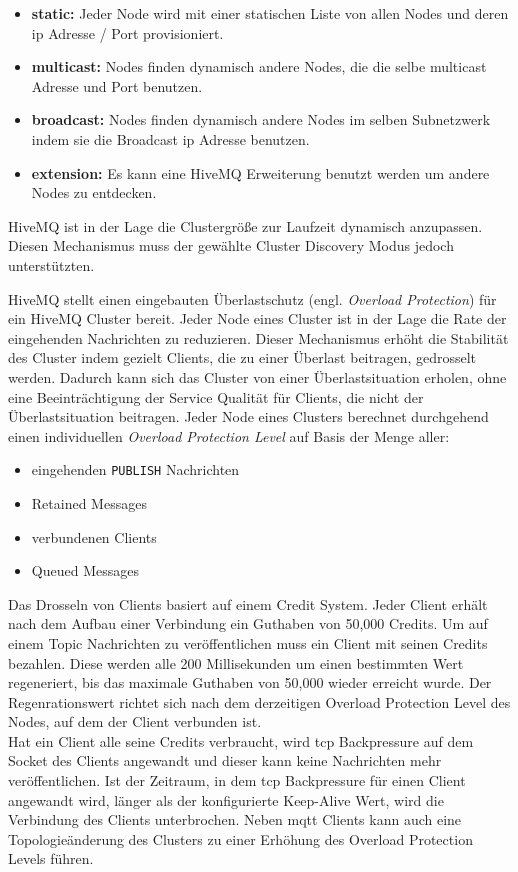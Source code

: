 \begin{itemize}
    \item \textbf{static:} Jeder Node wird mit einer statischen Liste von allen Nodes und deren \ac{ip} Adresse / Port provisioniert.
    \item \textbf{multicast:} Nodes finden dynamisch andere Nodes, die die selbe multicast Adresse und Port benutzen.
    \item \textbf{broadcast:} Nodes finden dynamisch andere Nodes im selben Subnetzwerk indem sie die Broadcast \ac{ip} Adresse benutzen.
    \item \textbf{extension:} Es kann eine HiveMQ Erweiterung benutzt werden um andere Nodes zu entdecken.
\end{itemize}
HiveMQ ist in der Lage die Clustergrö{\ss}e zur Laufzeit dynamisch anzupassen. Diesen Mechanismus muss der gewählte Cluster Discovery Modus jedoch unterstützten.
\cite{HiveMQClusterHiveMQ}

 \label{sb:overload-protection}
HiveMQ stellt einen eingebauten Überlastschutz (engl. \textit{Overload Protection}) für ein HiveMQ Cluster bereit. Jeder Node eines Cluster ist in der Lage die Rate der eingehenden Nachrichten zu reduzieren. Dieser Mechanismus erhöht die Stabilität des Cluster indem gezielt Clients, die zu einer Überlast beitragen, gedrosselt werden.
Dadurch kann sich das Cluster von einer Überlastsituation erholen, ohne eine Beeinträchtigung der Service Qualität für Clients, die nicht der Überlastsituation beitragen.
Jeder Node eines Clusters berechnet durchgehend einen individuellen \textit{Overload Protection Level} auf Basis der Menge aller:
\begin{itemize}
    \item eingehenden \verb|PUBLISH| Nachrichten
    \item Retained Messages
    \item verbundenen Clients
    \item Queued Messages
\end{itemize}
Das Drosseln von Clients basiert auf einem Credit System. Jeder Client erhält nach dem Aufbau einer Verbindung ein Guthaben von 50,000 Credits. Um auf einem Topic Nachrichten zu veröffentlichen muss ein Client mit seinen Credits bezahlen. Diese werden alle 200 Millisekunden um einen bestimmten Wert regeneriert, bis das maximale Guthaben von 50,000 wieder erreicht wurde. Der Regenrationswert richtet sich nach dem derzeitigen Overload Protection Level des Nodes, auf dem der Client verbunden ist.
\\
Hat ein Client alle seine Credits verbraucht, wird \ac{tcp} Backpressure auf dem Socket des Clients angewandt und dieser kann keine Nachrichten mehr veröffentlichen.
Ist der Zeitraum, in dem \ac{tcp} Backpressure für einen Client angewandt wird, länger als der konfigurierte Keep-Alive Wert, wird die Verbindung des Clients unterbrochen.
Neben \ac{mqtt} Clients kann auch eine Topologieänderung des Clusters zu einer Erhöhung des Overload Protection Levels führen.
\cite{ClusterOverloadProtection}

